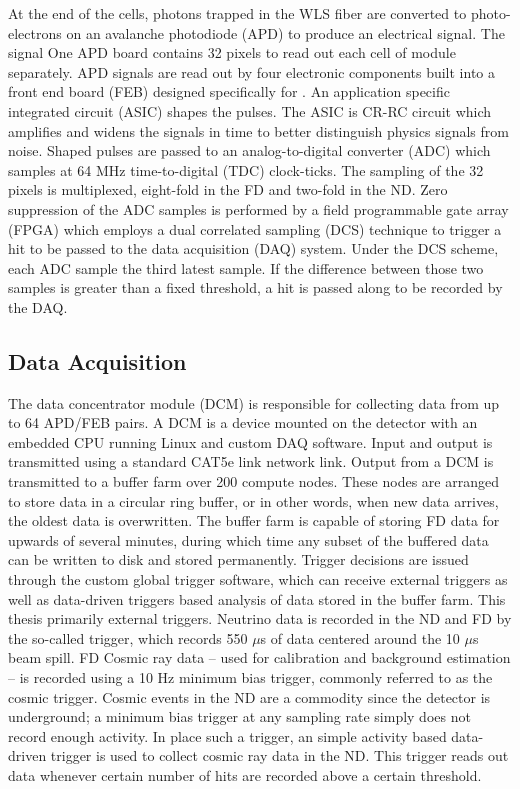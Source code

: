 At the end of the cells, photons trapped in the WLS fiber are converted to photo-electrons on an avalanche photodiode (APD) to produce an electrical signal.  The signal One APD board contains 32 pixels to read out each cell of module separately.  APD signals are read out by four electronic components built into a front end board (FEB) designed specifically for \nova.  An application specific integrated circuit (ASIC) shapes the pulses.  The ASIC is CR-RC circuit which amplifies and widens the signals in time to better distinguish physics signals from noise.   Shaped pulses are passed to an analog-to-digital converter (ADC) which samples at 64 MHz time-to-digital (TDC) clock-ticks.  The sampling of the 32 pixels is multiplexed, eight-fold in the FD and two-fold in the ND.  Zero suppression of the ADC samples is performed by a field programmable gate array (FPGA) which employs a dual correlated sampling (DCS) technique to trigger a hit to be passed to the data acquisition (DAQ) system.  Under the DCS scheme, each ADC sample the third latest sample.  If the difference between those two samples is greater than a fixed threshold, a hit is passed along to be recorded by the DAQ.

\subsection{Data Acquisition}

The \nova data concentrator module (DCM) is responsible for collecting data from up to 64 APD/FEB pairs.   A DCM is a device mounted on the detector with an embedded CPU running Linux and custom \nova DAQ software.  Input and output is transmitted using a standard CAT5e link network link.  Output from a DCM is transmitted to a buffer farm over 200 compute nodes.  These nodes are arranged to store data in a circular ring buffer, or in other words, when new data arrives, the oldest data is overwritten.  The buffer farm is capable of storing FD data for upwards of several minutes, during which time any subset of the buffered data can be written to disk and stored permanently.  Trigger decisions are issued through the custom \nova global trigger software, which can receive external triggers as well as data-driven triggers based analysis of data stored in the buffer farm.  This thesis primarily external triggers.  Neutrino data is recorded in the ND and FD by the so-called \numi trigger, which records 550 $\mu$s of data centered around the 10 $\mu$s \numi beam spill.  FD Cosmic ray data -- used for calibration and background estimation -- is recorded using a 10 Hz minimum bias trigger, commonly referred to as the cosmic trigger.   Cosmic events in the ND are a commodity since the detector is underground; a minimum bias trigger at any sampling rate simply does not record enough activity.  In place such a trigger, an simple activity based data-driven trigger is used to collect cosmic ray data in the ND.  This trigger reads out data whenever certain number of hits are recorded above a certain threshold.

